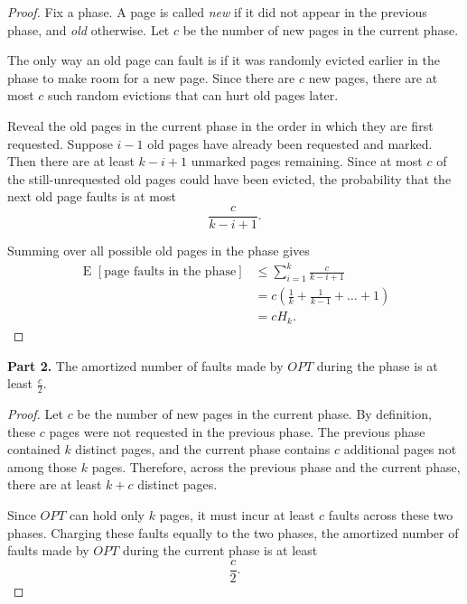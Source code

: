 \documentclass[14pt]{extreport}
\newcommand{\E}[2][]{\operatorname{E}_{#1}\left[#2\right]}
\begin{document}
    \begin{proof}
        Fix a phase. A page is called \textit{new} if it did not appear in the previous phase, and \textit{old} otherwise. Let $c$ be the number of new pages in the current phase.

        \vspace{2mm}
        The only way an old page can fault is if it was randomly evicted earlier in the phase to make room for a new page. Since there are $c$ new pages, there are at most $c$ such random evictions that can hurt old pages later.

        \vspace{2mm}
        Reveal the old pages in the current phase in the order in which they are first requested. Suppose $i - 1$ old pages have already been requested and marked. Then there are at least $k - i + 1$ unmarked pages remaining. Since at most $c$ of the still-unrequested old pages could have been evicted, the probability that the next old page faults is at most
        $$\frac{c}{k - i + 1}.$$

        \vspace{2mm}
        Summing over all possible old pages in the phase gives
        \begin{align*}
            \E{\text{page faults in the phase}}
            &\le \sum_{i=1}^{k} \frac{c}{k - i + 1} \\
            &= c \left( \frac{1}{k} + \frac{1}{k - 1} + \dots + 1 \right) \\
            &= cH_k.
        \end{align*}
    \end{proof}

    \textbf{Part 2. } The amortized number of faults made by $OPT$ during the phase is at least $\frac{c}{2}$.

    \begin{proof}
        Let $c$ be the number of new pages in the current phase. By definition, these $c$ pages were not requested in the previous phase. The previous phase contained $k$ distinct pages, and the current phase contains $c$ additional pages not among those $k$ pages. Therefore, across the previous phase and the current phase, there are at least $k+c$ distinct pages.

        \vspace{2mm}
        Since $OPT$ can hold only $k$ pages, it must incur at least $c$ faults across these two phases. Charging these faults equally to the two phases, the amortized number of faults made by $OPT$ during the current phase is at least
        $$\frac{c}{2}.$$
    \end{proof}
\end{document}
